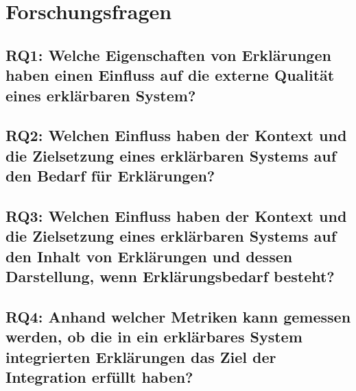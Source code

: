 \section{Forschungsfragen}

\subsection{RQ1: Welche Eigenschaften von Erklärungen haben einen Einfluss auf die externe Qualität eines erklärbaren System?}

\subsection{RQ2: Welchen Einfluss haben der Kontext und die Zielsetzung eines erklärbaren Systems auf den Bedarf für Erklärungen?}

\subsection{RQ3: Welchen Einfluss haben der Kontext und die Zielsetzung eines erklärbaren Systems auf den Inhalt von Erklärungen und dessen Darstellung, wenn Erklärungsbedarf besteht?}

\subsection{RQ4: Anhand welcher Metriken kann gemessen werden, ob die in ein erklärbares System integrierten Erklärungen das Ziel der Integration erfüllt haben?}